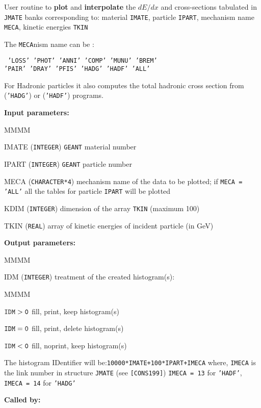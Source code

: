     
           
 
User routine to
{\bf plot} and {\bf interpolate} the $dE/dx$ and cross-sections
tabulated in {\tt JMATE} banks corresponding to:
material {\tt IMATE}, particle {\tt IPART}, mechanism name {\tt MECA},
kinetic energies {\tt TKIN}
 
The {\tt MECA}nism name can be :
\begin{center}
{\tt
'LOSS' 'PHOT' 'ANNI' 'COMP' 'MUNU' 'BREM' \\
'PAIR' 'DRAY' 'PFIS' 'HADG' 'HADF' 'ALL'
}
\end{center}
For Hadronic particles it also computes the total
hadronic cross section from 
({\tt'HADG'}) or  ({\tt 'HADF'}) programs.
 
{\bf Input parameters:}
\begin{DL}{MMMM}
\item[IMATE] ({\tt INTEGER}) {\tt GEANT} material number
\item[IPART] ({\tt INTEGER}) {\tt GEANT} particle number
\item[MECA]  ({\tt CHARACTER*4})
mechanism name of the data to be plotted;  if {\tt MECA =
'ALL'} all the tables for particle  {\tt IPART} will be plotted
\item [KDIM]  ({\tt INTEGER}) dimension of the array {\tt TKIN} (maximum
100)
\item[TKIN] ({\tt REAL}) array of kinetic energies of incident
particle (in GeV)
\end{DL}
 
{\bf Output parameters:}
\begin{DL}{MMMM}
\item[IDM]({\tt INTEGER}) treatment of the created histogram(s):
\begin{DL}{MMMM}
\item[${\tt IDM > 0}$]fill, print, keep histogram(s)
\item[${\tt IDM = 0}$]fill, print, delete histogram(s)
\item[${\tt IDM < 0}$]fill, noprint, keep histogram(s)
\end{DL}
The histogram IDentifier will be:{\tt 10000*IMATE+100*IPART+IMECA}
where, {\tt IMECA} is the link number in structure {\tt JMATE}
(see {\tt [CONS199]}) {\tt  IMECA = 13} for {\tt'HADF'}, {\tt IMECA = 14}
for {\tt'HADG'}
\end{DL}
 
{\bf Called by:} 
%
